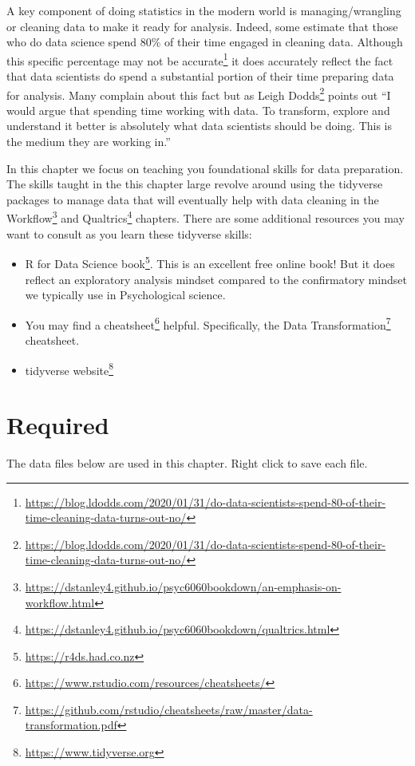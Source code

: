 \documentclass[
]{krantz}
\renewcommand{\href}[2]{#2\footnote{\url{#1}}}
\begin{document}
A key component of doing statistics in the modern world is managing/wrangling or cleaning data to make it ready for analysis. Indeed, some estimate that those who do data science spend 80\% of their time engaged in cleaning data. Although this specific percentage \href{https://blog.ldodds.com/2020/01/31/do-data-scientists-spend-80-of-their-time-cleaning-data-turns-out-no/}{may not be accurate} it does accurately reflect the fact that data scientists do spend a substantial portion of their time preparing data for analysis. Many complain about this fact but as \href{https://blog.ldodds.com/2020/01/31/do-data-scientists-spend-80-of-their-time-cleaning-data-turns-out-no/}{Leigh Dodds} points out ``I would argue that spending time working with data. To transform, explore and understand it better is absolutely what data scientists should be doing. This is the medium they are working in.''

In this chapter we focus on teaching you foundational skills for data preparation. The skills taught in the this chapter large revolve around using the tidyverse packages to manage data that will eventually help with data cleaning in the \href{https://dstanley4.github.io/psyc6060bookdown/an-emphasis-on-workflow.html}{Workflow} and \href{https://dstanley4.github.io/psyc6060bookdown/qualtrics.html}{Qualtrics} chapters. There are some additional resources you may want to consult as you learn these tidyverse skills:

\begin{itemize}
\item
  \href{https://r4ds.had.co.nz}{R for Data Science book}. This is an excellent free online book! But it does reflect an exploratory analysis mindset compared to the confirmatory mindset we typically use in Psychological science.
\item
  You may find a \href{https://www.rstudio.com/resources/cheatsheets/}{cheatsheet} helpful. Specifically, the \href{https://github.com/rstudio/cheatsheets/raw/master/data-transformation.pdf}{Data Transformation} cheatsheet.
\item
  \href{https://www.tidyverse.org}{tidyverse website}
\end{itemize}

\hypertarget{required}{%
\section{Required}\label{required}}

The data files below are used in this chapter. Right click to save each file.
\end{document}
